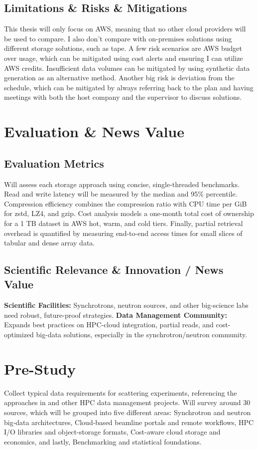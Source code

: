 \documentclass{article}
\begin{document}
\subsection{Limitations \& Risks \& Mitigations}
This thesis will only focus on AWS, meaning that no other cloud providers will be used to compare. I also don't compare with on-premises solutions using different storage solutions, such as tape. A few risk scenarios are AWS budget over usage, which can be mitigated using cost alerts and ensuring I can utilize AWS credits. Insufficient data volumes can be mitigated by using synthetic data generation as an alternative method. Another big risk is deviation from the schedule, which can be mitigated by always referring back to the plan and having meetings with both the host company and the supervisor to discuss solutions. 



\section{Evaluation \& News Value}

\subsection{Evaluation Metrics}
Will assess each storage approach using concise, single-threaded benchmarks. Read and write latency will be measured by the median and 95\% percentile. Compression efficiency combines the compression ratio with CPU time per GiB for zstd, LZ4, and gzip. Cost analysis models a one-month total cost of ownership for a 1 TB dataset in AWS hot, warm, and cold tiers. Finally, partial retrieval overhead is quantified by measuring end-to-end access times for small slices of tabular and dense array data. 

\subsection{Scientific Relevance \& Innovation / News Value}
\textbf{Scientific Facilities:} Synchrotrons, neutron sources, and other big-science labs need robust, future-proof strategies. \textbf{Data Management Community:} Expands best practices on HPC-cloud integration, partial reads, and cost-optimized big-data solutions, especially in the synchrotron/neutron community.




\section{Pre-Study}
Collect typical data requirements for scattering experiments, referencing the approaches in \cite{wang2018synchrotron, meyer2014store, moriyama2019public, godoy2021efficient} and other HPC data management projects. Will survey around 30 sources, which will be grouped into five different areas: Synchrotron and neutron big‐data architectures, Cloud‐based beamline portals and remote workflows, HPC I/O libraries and object-storage formats, Cost-aware cloud storage and economics, and lastly, Benchmarking and statistical foundations.
\end{document}
